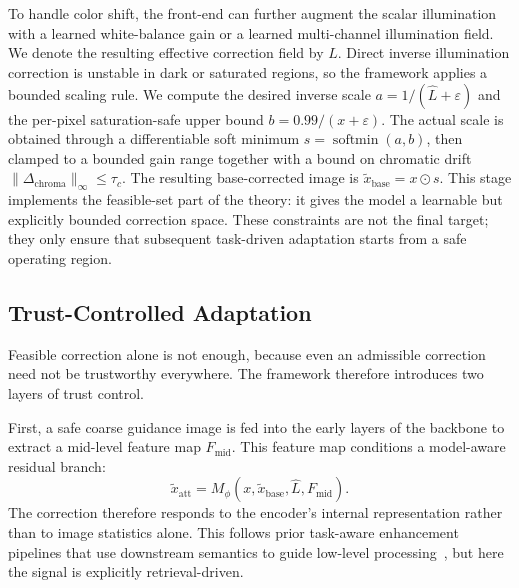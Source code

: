 \documentclass[sigconf,screen,review,anonymous]{acmart}
\begin{document}
To handle color shift, the front-end can further augment the scalar illumination with a
learned white-balance gain or a learned multi-channel illumination field.
We denote the resulting effective correction field by $\hat{L}$.
Direct inverse illumination correction is unstable in dark or saturated regions,
so the framework applies a bounded scaling rule.
We compute the desired inverse scale
$a = 1/(\hat{L} + \varepsilon)$
and the per-pixel saturation-safe upper bound
$b = 0.99/(x + \varepsilon)$.
The actual scale is obtained through a differentiable soft minimum
$s = \operatorname{softmin}(a,b)$,
then clamped to a bounded gain range together with a bound on chromatic drift
$\|\Delta_{\text{chroma}}\|_{\infty} \le \tau_c$.
The resulting base-corrected image is
$\tilde{x}_{\text{base}} = x \odot s$.
This stage implements the feasible-set part of the theory: it gives the model a
learnable but explicitly bounded correction space.
These constraints are not the final target; they only ensure that subsequent
task-driven adaptation starts from a safe operating region.

\subsection{Trust-Controlled Adaptation}
\label{sec:trust}

Feasible correction alone is not enough, because even an admissible correction
need not be trustworthy everywhere.
The framework therefore introduces two layers of trust control.

First, a safe coarse guidance image is fed into the early layers of the
backbone to extract a mid-level feature map $F_{\text{mid}}$.
This feature map conditions a model-aware residual branch:
\begin{equation}
  \tilde{x}_{\text{att}}
  =
  M_{\phi}(x, \tilde{x}_{\text{base}}, \hat{L}, F_{\text{mid}}).
\end{equation}
The correction therefore responds to the encoder's internal representation
rather than to image statistics alone.
This follows prior task-aware enhancement pipelines that use downstream
semantics to guide low-level processing~\cite{liu2022imageadaptive,hashmi2023featenhancer,wu2023semanticaware},
but here the signal is explicitly retrieval-driven.
\end{document}
